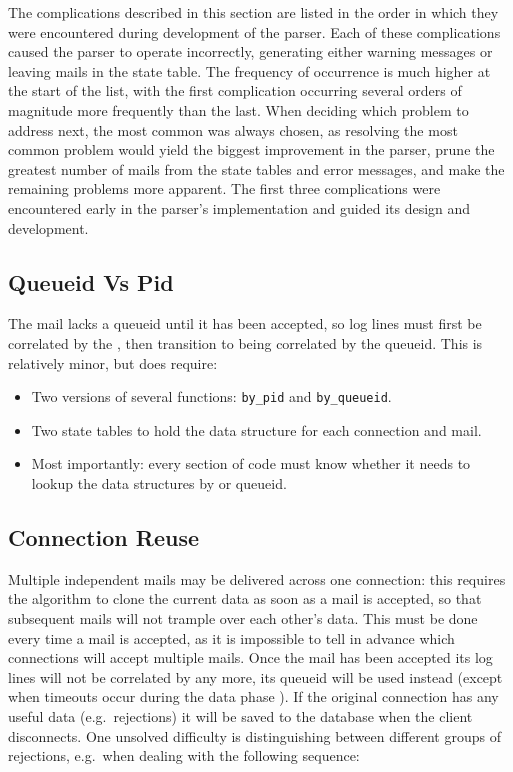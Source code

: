 The complications described in this section are listed in the order in
which they were encountered during development of the parser.  Each of
these complications caused the parser to operate incorrectly, generating
either warning messages or leaving mails in the state table.  The frequency
of occurrence is much higher at the start of the list, with the first
complication occurring several orders of magnitude more frequently than the
last.  When deciding which problem to address next, the most common was
always chosen, as resolving the most common problem would yield the biggest
improvement in the parser, prune the greatest number of mails from the
state tables and error messages, and make the remaining problems more
apparent.  The first three complications were encountered early in the
parser's implementation and guided its design and development.

\subsection{Queueid Vs Pid}

The mail lacks a queueid until it has been accepted, so log lines must
first be correlated by the  , then transition to
being correlated by the queueid.  This is relatively minor, but does
require:

\begin{itemize}

    \item Two versions of several functions: \texttt{by\_pid} and
        \texttt{by\_queueid}.

    \item Two state tables to hold the data structure for each connection
        and mail.

    \item Most importantly: every section of code must know whether it
        needs to lookup the data structures by  or queueid.

\end{itemize}

\subsection{Connection Reuse}

\label{connection reuse}

Multiple independent mails may be delivered across one connection: this
requires the algorithm to clone the current data as soon as a mail is
accepted, so that subsequent mails will not trample over each other's data.
This must be done every time a mail is accepted, as it is impossible to
tell in advance which connections will accept multiple mails.  Once the
mail has been accepted its log lines will not be correlated by
 any more, its queueid will be used instead (except when
timeouts occur during the data phase
).  If the original connection has
any useful data (e.g.\ rejections) it will be saved to the database when
the client disconnects.  One unsolved difficulty is distinguishing between
different groups of rejections, e.g.\ when dealing with the following
sequence:

